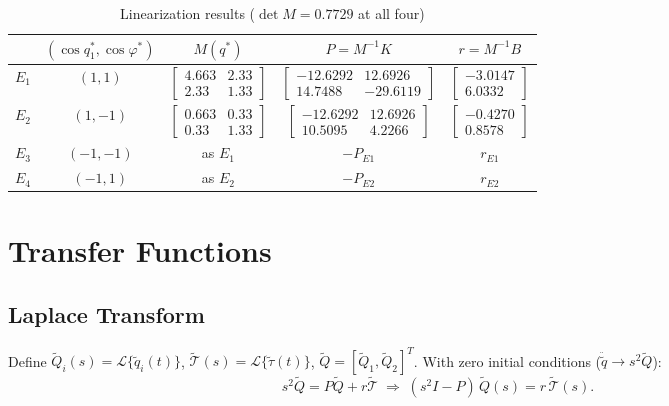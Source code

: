 \documentclass[10pt,twocolumn,letterpaper]{article}
\begin{document}
\begin{table}[h]
\caption{Linearization results ($\det M=0.7729$ at all four)}\label{tab:lin}
\centering\footnotesize\setlength{\tabcolsep}{4pt}\renewcommand{\arraystretch}{1.3}
\begin{tabular}{@{}ccccc@{}}
\toprule
 & $(\cos q_1^*,\cos\varphi^*)$ & $M(q^*)$ & $P=M^{-1}K$ & $r=M^{-1}B$\\
\midrule
$E_1$ & $(1,1)$ & $\left[\begin{smallmatrix}4.663&2.33\\2.33&1.33\end{smallmatrix}\right]$ & $\left[\begin{smallmatrix}-12.6292&12.6926\\14.7488&-29.6119\end{smallmatrix}\right]$ & $\left[\begin{smallmatrix}-3.0147\\6.0332\end{smallmatrix}\right]$\\
$E_2$ & $(1,-1)$ & $\left[\begin{smallmatrix}0.663&0.33\\0.33&1.33\end{smallmatrix}\right]$ & $\left[\begin{smallmatrix}-12.6292&12.6926\\10.5095&4.2266\end{smallmatrix}\right]$ & $\left[\begin{smallmatrix}-0.4270\\0.8578\end{smallmatrix}\right]$\\
$E_3$ & $(-1,-1)$ & as $E_1$ & $-P_{E1}$ & $r_{E1}$\\
$E_4$ & $(-1,1)$ & as $E_2$ & $-P_{E2}$ & $r_{E2}$\\
\bottomrule
\end{tabular}
\end{table}

\section{Transfer Functions}
\subsection{Laplace Transform}
Define $\tilde Q_i(s)=\mathcal L\{\tilde q_i(t)\}$, $\tilde{\mathcal T}(s)=\mathcal L\{\tilde\tau(t)\}$, $\tilde Q=[\tilde Q_1,\tilde Q_2]^T$. With zero initial conditions ($\ddot{\tilde q}\to s^2\tilde Q$):
\begin{equation*}
s^2\tilde Q=P\tilde Q+r\tilde{\mathcal T}\;\Rightarrow\;(s^2I-P)\,\tilde Q(s)=r\,\tilde{\mathcal T}(s).
\end{equation*}
\end{document}
